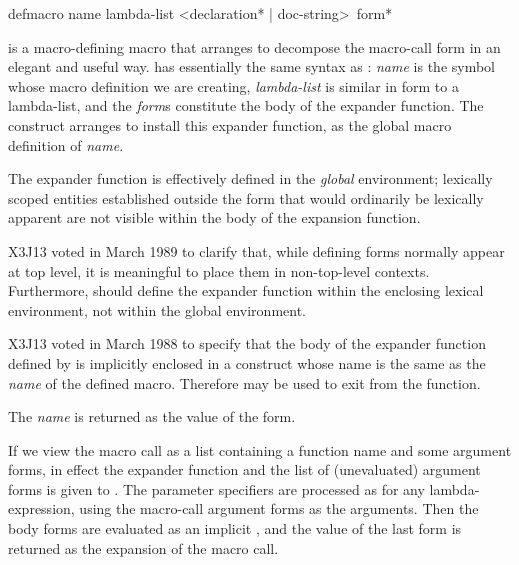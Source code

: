 \begin{defmac}
defmacro name lambda-list <{declaration}* | doc-string> {\,form}*

 is a macro-defining macro that
arranges to decompose the macro-call form in an elegant and useful way.
 has essentially the same syntax as : \emph{name} is the
symbol whose macro definition we are creating, \emph{lambda-list} is similar in
form to a lambda-list, and
the \emph{form\/}s constitute the body of the expander function.
The  construct arranges to install this expander function,
as the global macro definition of \emph{name}.

\begin{obsolete}
The expander function
is effectively defined in the \emph{global} environment;
lexically scoped entities established
outside the  form that would ordinarily be lexically apparent
are not visible within the body of the expansion function.
\end{obsolete}

\begin{newer}
X3J13 voted in March 1989 
to clarify that, while defining forms normally appear at top level,
it is meaningful to place them in non-top-level contexts.
Furthermore,  should define the expander function
within the enclosing lexical environment, not within the global
environment.
\end{newer}

\begin{newer}
X3J13 voted in March 1988 
to specify that the body of the expander function defined
by  is implicitly enclosed in a  construct
whose name is the same as the \emph{name} of the defined macro.
Therefore  may be used to exit from the function.
\end{newer}

The \emph{name} is returned
as the value of the  form.

If we view the 
macro call as a list containing a function name and some argument forms,
in effect the expander function and the list of (unevaluated) argument
forms is given to .
The parameter specifiers are processed as for any lambda-expression,
using the macro-call argument forms as the arguments.
Then the body forms are evaluated
as an implicit , and the value of the last form
is returned as the expansion of the macro call.


\end{defmac}
